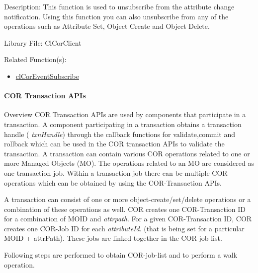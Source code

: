 \begin{Desc}
\item[Description:]This function is used to unsubscribe from the attribute change notification. Using this function you can also unsubscribe from any of the operations such as Attribute Set, Object Create and Object Delete.\end{Desc}
\begin{Desc}
\item[Library File:]Cl\-Cor\-Client\end{Desc}
\begin{Desc}
\item[Related Function(s):]\begin{itemize}
\item \hyperlink{group__group13}{cl\-Cor\-Event\-Subscribe} \end{itemize}
\end{Desc}
\hypertarget{pagecor500}{}\paragraph{COR Transaction APIs}\label{pagecor500}
\begin{Desc}
\item[Overview]COR Transaction APIs are used by components that participate in a transaction. A component participating in a transaction obtains a transaction handle ( {\em txn\-Handle\/}) through the callback functions for validate,commit and rollback which can be used in the COR transaction APIs to validate the transaction. A transaction can contain various COR operations related to one or more Managed Objects (MO). The operations related to an MO are considered as one transaction job. Within a transaction job there can be multiple COR operations which can be obtained by using the COR-Transaction APIs.\end{Desc}
A transaction can consist of one or more object-create/set/delete operations or a combination of these operations as well. COR creates one COR-Transaction ID for a combination of MOID and {\em attrpath\/}. For a given COR-Transaction ID, COR creates one COR-Job ID for each {\em attribute\-Id\/}. (that is being set for a particular MOID + attr\-Path). These jobs are linked together in the COR-job-list.

Following steps are performed to obtain COR-job-list and to perform a walk operation.

